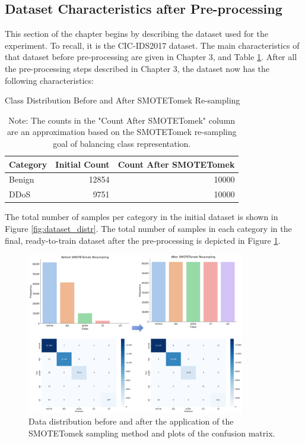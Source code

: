 \subsection{Dataset Characteristics after Pre-processing}

This section of the chapter begins by describing the dataset used for the experiment. To recall, it is the CIC-IDS2017 dataset. The main characteristics of that dataset before pre-processing are given in Chapter 3, and Table \ref{tab:cic_ids2017_dataset_initial_characteristics}. After all the pre-processing steps described in Chapter 3, the dataset now has the following characteristics:\\
\begin{table}[h!]
	\centering
	\caption{Class Distribution Before and After SMOTETomek Re-sampling}
	\label{tab:cic_ids2017_dataset_initial_characteristics}
	\begin{tabular}{lrr}
		\toprule
		\textbf{Category} & \textbf{Initial Count} & \textbf{Count After SMOTETomek} \\
		\midrule
		Benign & 12854 & 10000 \\
		DDoS & 9751 & 10000 \\
		\bottomrule
	\end{tabular}
	\vspace{0.5em}
	\small
	\caption*{Note: The counts in the "Count After SMOTETomek" column are an approximation based on the SMOTETomek re-sampling goal of balancing class representation.}
\end{table}

The total number of samples per category in the initial dataset is shown in Figure \ref{fig:dataset_distr}. The total number of samples in each category in the final, ready-to-train dataset after the pre-processing is depicted in Figure \ref{fig:number_of_samples_per_category_post_smotetomekt}.

\begin{figure}[H]
	\centering
	\includegraphics[width=0.85\textwidth]{assets/figures/smotetomek.png}
	\caption{Data distribution before and after the application of the SMOTETomek sampling method and plots of the confusion matrix. }
	\label{fig:number_of_samples_per_category_post_smotetomekt}
\end{figure}
\parencite{zhang2025sedwnet}\\

